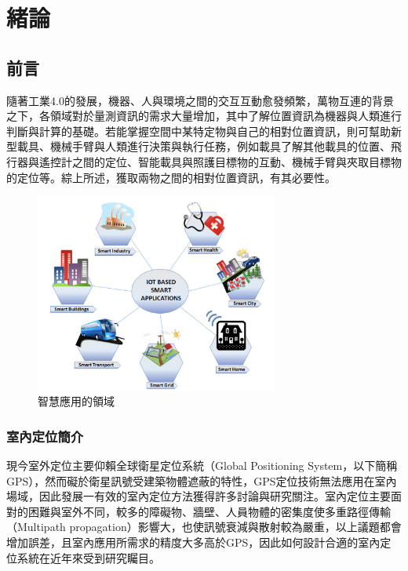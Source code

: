 \chapter{緒論}


\section{前言} %

隨著工業4.0的發展，機器、人與環境之間的交互互動愈發頻繁，萬物互連的背景之下，各領域對於量測資訊的需求大量增加，其中了解位置資訊為機器與人類進行判斷與計算的基礎。若能掌握空間中某特定物與自己的相對位置資訊，則可幫助新型載具、機械手臂與人類進行決策與執行任務，例如載具了解其他載具的位置、飛行器與遙控計之間的定位、智能載具與照護目標物的互動、機械手臂與夾取目標物的定位等。綜上所述，獲取兩物之間的相對位置資訊，有其必要性。

\begin{figure}[ht]
    \centering
    \includegraphics[width=8cm]{ch1pic/iot.png}
    \caption{智慧應用的領域\cite{iot}}
    \label{pic:iot}
\end{figure}




\subsection{室內定位簡介}
\label{chp:intro}
現今室外定位主要仰賴全球衛星定位系統（Global Positioning System，以下簡稱GPS），然而礙於衛星訊號受建築物體遮蔽的特性，GPS定位技術無法應用在室內場域，因此發展一有效的室內定位方法獲得許多討論與研究關注。室內定位主要面對的困難與室外不同，較多的障礙物、牆壁、人員物體的密集度使多重路徑傳輸（Multipath propagation）影響大，也使訊號衰減與散射較為嚴重，以上議題都會增加誤差，且室內應用所需求的精度大多高於GPS，因此如何設計合適的室內定位系統在近年來受到研究矚目\cite{survey_indoor2014}。

